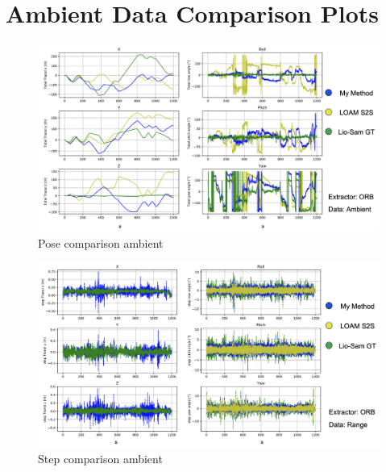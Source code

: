 \section{Ambient Data Comparison Plots}{

    \begin{figure}[ht]
        \centering
        \includegraphics[scale = 0.25]{images/comparison_appendix/pose_ambient.png}
        \caption{Pose comparison ambient}
        \label{fig:pose_comparison_ambient}
    \end{figure}
    
    \begin{figure}[ht]
        \centering
        \includegraphics[scale = 0.25]{images/comparison_appendix/steps_ambient.png}
        \caption{Step comparison ambient}
        \label{fig:step_comparison_ambient}
    \end{figure}

}
